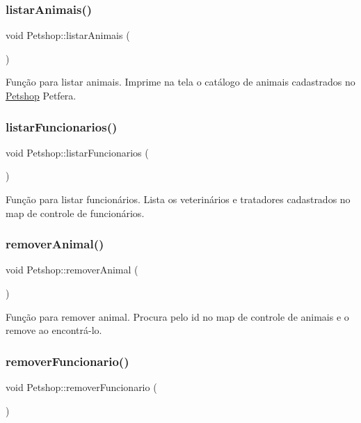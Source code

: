 \subsubsection{\texorpdfstring{listar\+Animais()}{listarAnimais()}}
{\footnotesize\ttfamily void Petshop\+::listar\+Animais (\begin{DoxyParamCaption}{ }\end{DoxyParamCaption})}

Função para listar animais. Imprime na tela o catálogo de animais cadastrados no \hyperlink{classPetshop}{Petshop} Petfera. \mbox{\label{classPetshop_a92af46eb9dea6df3b89ce06f0e27e599}} 
\subsubsection{\texorpdfstring{listar\+Funcionarios()}{listarFuncionarios()}}
{\footnotesize\ttfamily void Petshop\+::listar\+Funcionarios (\begin{DoxyParamCaption}{ }\end{DoxyParamCaption})}

Função para listar funcionários. Lista os veterinários e tratadores cadastrados no map de controle de funcionários. \mbox{\label{classPetshop_a745038ad9cb1b173bfadef5043bfc655}} 
\subsubsection{\texorpdfstring{remover\+Animal()}{removerAnimal()}}
{\footnotesize\ttfamily void Petshop\+::remover\+Animal (\begin{DoxyParamCaption}{ }\end{DoxyParamCaption})}

Função para remover animal. Procura pelo id no map de controle de animais e o remove ao encontrá-\/lo. \mbox{\label{classPetshop_af427ab474b72f1c1537d4c7fa055290d}} 
\subsubsection{\texorpdfstring{remover\+Funcionario()}{removerFuncionario()}}
{\footnotesize\ttfamily void Petshop\+::remover\+Funcionario (\begin{DoxyParamCaption}{ }\end{DoxyParamCaption})}

